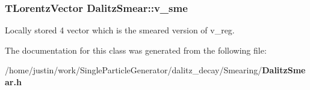\subsubsection{\setlength{\rightskip}{0pt plus 5cm}TLorentz\-Vector \bf{Dalitz\-Smear::v\_\-sme}}\label{classDalitzSmear_87df42c7420bd96bcd61ce25d10ec6ed}


Locally stored 4 vector which is the smeared version of v\_\-reg. 



The documentation for this class was generated from the following file:\begin{CompactItemize}
\item 
/home/justin/work/Single\-Particle\-Generator/dalitz\_\-decay/Smearing/\bf{Dalitz\-Smear.h}\end{CompactItemize}
